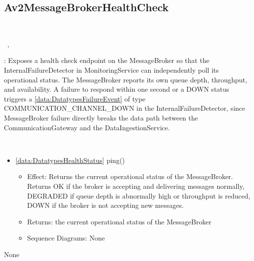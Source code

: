   \subsection{Av2MessageBrokerHealthCheck}\label{int:InterfacesAv2MessageBrokerHealthCheck}
    \begin{description}
      \item[Provided by:] \iconcomponent{}~
      \item[Required by:] \iconcomponent{}~, \iconcomponent{}~ 
           \item[Description]: Exposes a health check endpoint on the MessageBroker so that the InternalFailureDetector in MonitoringService can independently poll its operational status. The MessageBroker reports its own queue depth, throughput, and availability. A failure to respond within one second or a DOWN status triggers a \ref{data:DatatypesFailureEvent} of type COMMUNICATION\_CHANNEL\_DOWN in the InternalFailureDetector, since MessageBroker failure directly breaks the data path between the CommunicationGateway and the DataIngestionService.
      \item[Operations:] ~
    \begin{itemize}[noitemsep,nolistsep,leftmargin=-.25cm]
      \item \textsf{\ref{data:DatatypesHealthStatus} ping()}
        \begin{itemize}[noitemsep,nolistsep]
           \item Effect: Returns the current operational status of the MessageBroker. Returns OK if the broker is accepting and delivering messages normally, DEGRADED if queue depth is abnormally high or throughput is reduced, DOWN if the broker is not accepting new messages. 
           \item Returns: the current operational status of the MessageBroker
           \item Sequence Diagrams: None
        \end{itemize}
    \end{itemize}
      \item[Diagrams:] None
    \end{description}

